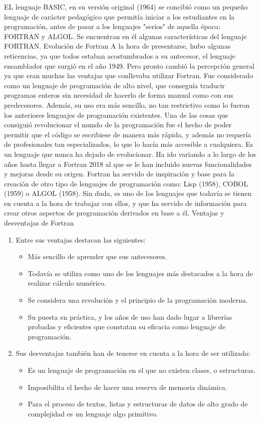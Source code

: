 \documentclass{article}
\begin{document}
EL lenguaje BASIC, en su versión original (1964) se concibió como un pequeño lenguaje de carácter pedagógico que permitía iniciar a los estudiantes en la programación, antes de pasar a los lenguajes "serios" de aquella época: FORTRAN y ALGOL. Se encuentran en él algunas características del lenguaje FORTRAN.
Evolución de Fortran
A la hora de presentarse, hubo  algunas reticencias, ya que todos estaban acostumbrados a su antecesor, el lenguaje ensamblador que surgió en el año 1949.
Pero pronto cambió la percepción general ya que eran muchas las ventajas que conllevaba utilizar Fortran. Fue considerado como un lenguaje de programación de alto nivel, que conseguía traducir programas enteros sin necesidad de hacerlo de forma manual como con sus predecesores. Además, su uso era más sencillo, no tan restrictivo como lo fueron los anteriores lenguajes de programación existentes.
Una de las cosas que consiguió revolucionar el mundo de la programación fue el hecho de poder permitir que el código se escribiese de manera más rápida, y además no requería de profesionales tan especializados, lo que lo hacía más accesible a cualquiera.
Es un lenguaje que nunca ha dejado de evolucionar. Ha ido variando a lo largo de los años hasta llegar a Fortran 2018 al que se le han incluido nuevas funcionalidades y mejoras desde su origen.
Fortran ha servido de inspiración y base para la creación de otro tipo de lenguajes de programación como: Lisp (1958), COBOL (1959) o ALGOL (1958).
Sin duda, es uno de los lenguajes que todavía se tienen en cuenta a la hora de trabajar con ellos, y que ha servido de información para crear otros aspectos de programación derivados en base a él.
Ventajas y desventajas de Fortran
\begin{enumerate}
\item Entre sus ventajas destacan las siguientes:
\begin{itemize}
\item Más sencillo de aprender que sus antecesores.
\item Todavía se utiliza como uno de los lenguajes más destacados a la hora de realizar cálculo numérico.
\item	Se considera una revolución y el principio de la programación moderna.
\item	Su puesta en práctica, y los años de uso han dado lugar a librerías probadas y eficientes que constatan su eficacia como lenguaje de programación.
\end{itemize}

\item Sus desventajas también han de tenerse en cuenta a la hora de ser utilizado:
\begin{itemize}
\item	Es un lenguaje de programación en el que no existen clases, o estructuras.
\item	Imposibilita el hecho de hacer una reserva de memoria dinámica.
\item	Para el proceso de textos, listas y estructuras de datos de alto grado de complejidad es un lenguaje algo primitivo.
\end{itemize}

\end{enumerate}
\end{document}
